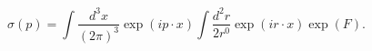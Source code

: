 \begin{equation}
\sigma(p)=\int\frac{d^{3}x}{(2\pi)^{3}}\exp(ip\cdot x)\int\frac{d^{2}r}%
{2r^{0}}\exp(ir\cdot x)\exp(F).
\end{equation}

